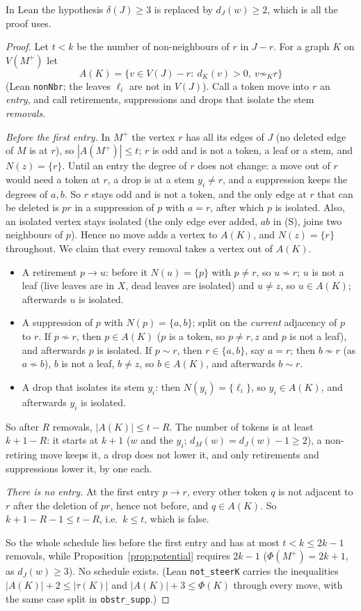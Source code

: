 \documentclass[11pt]{amsart}
\theoremstyle{definition}
\begin{document}
In Lean the hypothesis $\delta(J)\ge3$ is replaced by $d_J(w)\ge2$, which is all the proof uses.

\begin{proof}
Let $t<k$ be the number of non-neighbours of $r$ in $J-r$. For a graph $K$ on $V(M^+)$ let
\[A(K)=\{v\in V(J)-r:\ d_K(v)>0,\ v\not\sim_K r\}\]
(Lean \texttt{nonNbr}; the leaves $\ell_i$ are not in $V(J)$). Call a token move into $r$ an
\emph{entry}, and call retirements, suppressions and drops that isolate the stem \emph{removals}.

\emph{Before the first entry.} In $M^+$ the vertex $r$ has all its edges of $J$ (no deleted edge
of $M$ is at $r$), so $|A(M^+)|\le t$; $r$ is odd and is not a token, a leaf or a stem, and $N(z)=\{r\}$.
Until an entry the degree of $r$ does not change: a move out of $r$ would need a token at $r$, a drop
is at a stem $y_i\ne r$, and a suppression keeps the degrees of $a,b$. So $r$ stays odd and is not a
token, and the only edge at $r$ that can be deleted is $pr$ in a suppression of $p$ with
$a=r$, after which $p$ is isolated. Also, an isolated vertex stays isolated (the only edge ever added,
$ab$ in (S), joins two neighbours of $p$). Hence no move adds a vertex to $A(K)$, and $N(z)=\{r\}$
throughout. We claim that every removal takes a vertex out of $A(K)$.
\begin{itemize}
\item A retirement $p\to u$: before it $N(u)=\{p\}$ with $p\ne r$, so $u\not\sim r$; $u$ is not a
leaf (live leaves are in $X$, dead leaves are isolated) and $u\ne z$, so $u\in A(K)$; afterwards
$u$ is isolated.
\item A suppression of $p$ with $N(p)=\{a,b\}$; split on the \emph{current} adjacency of $p$ to $r$.
If $p\not\sim r$, then $p\in A(K)$ ($p$ is a token, so $p\ne r,z$ and $p$ is not a leaf), and
afterwards $p$ is isolated. If $p\sim r$, then $r\in\{a,b\}$, say $a=r$; then $b\not\sim r$ (as
$a\not\sim b$), $b$ is not a leaf, $b\ne z$, so $b\in A(K)$, and afterwards $b\sim r$.
\item A drop that isolates its stem $y_i$: then $N(y_i)=\{\ell_i\}$, so $y_i\in A(K)$, and
afterwards $y_i$ is isolated.
\end{itemize}
So after $R$ removals, $|A(K)|\le t-R$. The number of tokens is at least $k+1-R$: it starts at $k+1$
($w$ and the $y_i$; $d_M(w)=d_J(w)-1\ge2$), a non-retiring move keeps it, a drop does not lower it,
and only retirements and suppressions lower it, by one each.

\emph{There is no entry.} At the first entry $p\to r$, every other token $q$ is not adjacent to $r$
after the deletion of $pr$, hence not before, and $q\in A(K)$. So $k+1-R-1\le t-R$, i.e.\ $k\le t$,
which is false.

So the whole schedule lies before the first entry and has at most $t<k\le2k-1$ removals, while
Proposition~\ref{prop:potential} requires $2k-1$ ($\Phi(M^+)=2k+1$, as $d_J(w)\ge3$). No schedule
exists. (Lean \texttt{not\_steerK} carries the inequalities $|A(K)|+2\le|\tau(K)|$ and
$|A(K)|+3\le\Phi(K)$ through every move, with the same case split in \texttt{obstr\_supp}.)
\end{proof}
\end{document}
